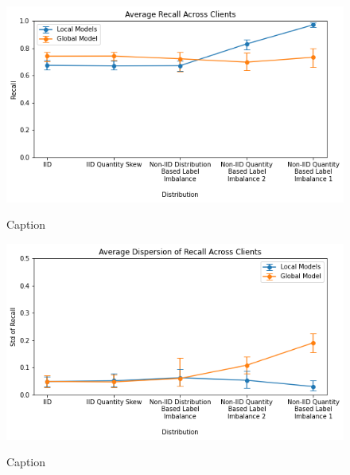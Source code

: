 \documentclass[letterpaper]{article} %
\begin{document}
\begin{figure}[hbt!]
{\includegraphics[width=\columnwidth]{Avg_recall_of_local_models_against_that_of_global_model}}
\caption{Caption}
\end{figure}

\begin{figure}[hbt!]
{\includegraphics[width=\columnwidth]{Avg_dispersion_of_recall_of_local_models_against_that_of_global_model}}
\caption{Caption}
\end{figure}
\end{document}
